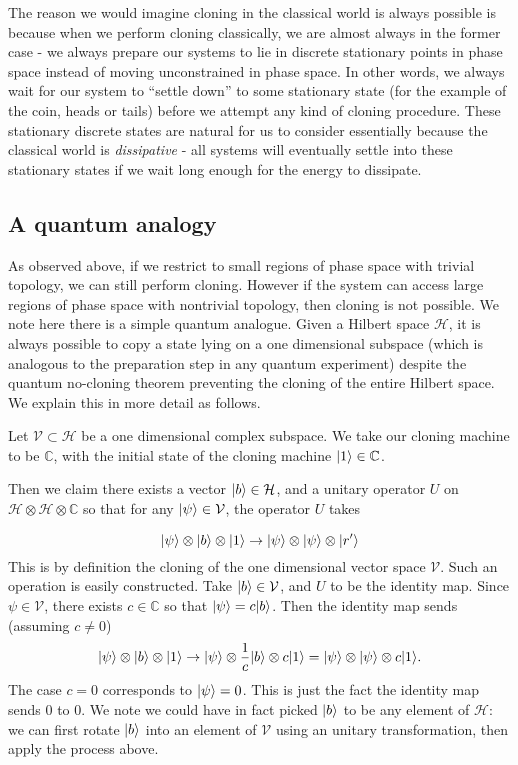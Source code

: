 \documentclass[jmp,amsmath,amssymb]{revtex4-1}
\theoremstyle{plain}
\DeclarePairedDelimiter\ket{\lvert}{\rangle}
\begin{document}
The reason we would imagine cloning in the classical world is always possible is because when we perform cloning classically, we are almost always in the former case - we always prepare our systems to lie in discrete stationary points in phase space instead of moving unconstrained in phase space. In other words, we always wait for our system to ``settle down'' to some stationary state (for the example of the coin, heads or tails) before we attempt any kind of cloning procedure. These stationary discrete states are natural for us to consider essentially because the classical world is \emph{dissipative} - all systems will eventually settle into these stationary states if we wait long enough for the energy to dissipate.

\subsection{A quantum analogy} \label{subsec:a quantum analogy}
As observed above, if we restrict to small regions of phase space with trivial topology, we can still perform cloning. However if the system can access large regions of phase space with nontrivial topology, then cloning is not possible. We note here there is a simple quantum analogue. Given a Hilbert space $\mathcal{H}$, it is always possible to copy a state lying on a one dimensional subspace (which is analogous to the preparation step in any quantum experiment) despite the quantum no-cloning theorem preventing the cloning of the entire Hilbert space. We explain this in more detail as follows.

Let $\mathcal{V} \subset \mathcal{H}$ be a one dimensional complex subspace. We take our cloning machine to be $\mathbb{C}$, with the initial state of the cloning machine $\ket{1} \in \mathbb{C}$.

Then we claim there exists a vector $\ket{b} \in \mathcal{H}$, and a unitary operator $U$ on $\mathcal{H}\otimes \mathcal{H} \otimes \mathbb{C}$ so that for any $\ket{\psi} \in \mathcal{V}$, the operator $U$ takes

\[
\ket{\psi} \otimes \ket{b} \otimes \ket{1} \rightarrow \ket{\psi}\otimes \ket{\psi} \otimes \ket{r'}
\]
This is by definition the cloning of the one dimensional vector space $\mathcal{V}$.
Such an operation is easily constructed. Take $\ket{b} \in \mathcal{V}$, and $U$ to be the identity map. Since $\psi \in \mathcal{V}$, there exists $c\in \mathbb{C}$ so that $\ket{\psi} = c\ket{b}$. Then the identity map sends (assuming $c\neq 0$)
\[
\ket{\psi} \otimes \ket{b} \otimes \ket{1}  \rightarrow \ket{\psi} \otimes \frac{1}{c} \ket{b} \otimes c\ket{1} = \ket{\psi}\otimes \ket{\psi} \otimes c\ket{1}.
\]
The case $c=0$ corresponds to $\ket{\psi}=0$. This is just the fact the identity map sends 0 to 0. We note we could have in fact picked $\ket{b}$ to be any element of $\mathcal{H}$: we can first rotate $\ket{b}$ into an element of $\mathcal{V}$ using an unitary transformation, then apply the process above.
\end{document}
